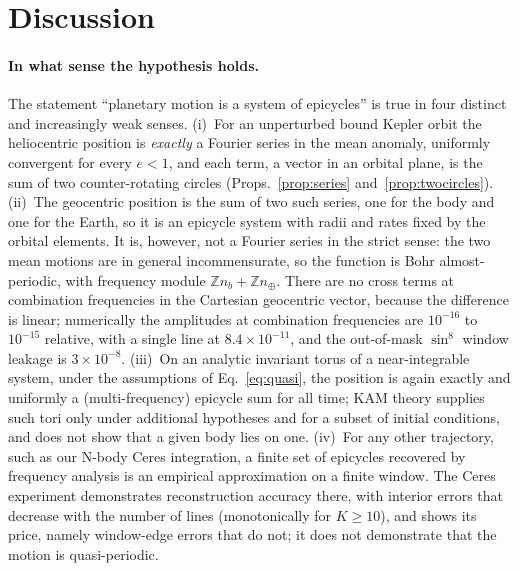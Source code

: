 \section{Discussion}
\label{sec:discussion}

\paragraph*{In what sense the hypothesis holds.}
The statement ``planetary motion is a system of epicycles'' is true in four
distinct and increasingly weak senses. (i)~For an unperturbed bound Kepler
orbit the heliocentric position is \emph{exactly} a Fourier series in the
mean anomaly, uniformly convergent for every $e<1$, and each term, a vector
in an orbital plane, is the sum of two counter-rotating circles
(Props.~\ref{prop:series} and~\ref{prop:twocircles}). (ii)~The geocentric
position is the sum of two such series, one for the body and one for the
Earth, so it is an epicycle system with radii and rates fixed by the orbital
elements. It is, however, not a Fourier series in the strict sense: the two
mean motions are in general incommensurate, so the function is Bohr
almost-periodic, with frequency module $\mathbb Zn_b+\mathbb Zn_\oplus$. There
are no cross terms at combination frequencies in the Cartesian geocentric
vector, because the difference is linear; numerically the amplitudes at
combination frequencies are $10^{-16}$ to $10^{-15}$ relative, with a single
line at $8.4\times10^{-11}$, and the out-of-mask $\sin^8$ window leakage
is $3\times10^{-8}$. (iii)~On
an analytic invariant torus of a near-integrable system, under the
assumptions of Eq.~\eqref{eq:quasi}, the position is again exactly and
uniformly a (multi-frequency) epicycle sum for all time; KAM theory supplies
such tori only under additional hypotheses and for a subset of initial
conditions, and does not show that a given body lies on one. (iv)~For any other
trajectory, such as our N-body Ceres integration, a finite set of epicycles
recovered by frequency analysis is an empirical approximation on a finite
window. The Ceres experiment demonstrates reconstruction accuracy there, with
interior errors that decrease with the number of lines (monotonically for $K\ge10$), and shows
its price, namely window-edge errors that do not; it does not demonstrate that
the motion is quasi-periodic.

